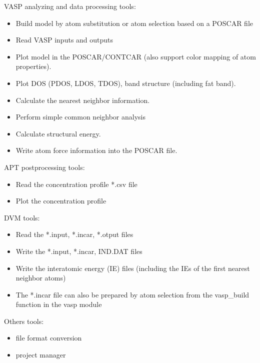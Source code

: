 \documentclass[12pt]{book}
\begin{document}
VASP analyzing and data processing tools:
\begin{itemize}
\item Build model by atom substitution or atom selection based on a POSCAR file
\item Read VASP inputs and outputs
\item Plot model in the POSCAR/CONTCAR (also support color mapping of atom properties).
\item Plot DOS (PDOS, LDOS, TDOS), band structure (including fat band).
\item Calculate the nearest neighbor information.
\item Perform simple common neighbor analysis
\item Calculate structural energy.
\item Write atom force information into the POSCAR file.
\end{itemize}

APT postprocessing tools:
\begin{itemize}
\item Read the concentration profile *.csv file
\item Plot the concentration profile
\end{itemize}

DVM tools:
\begin{itemize}
\item Read the *.input, *.incar, *.otput files
\item Write the *.input, *.incar, IND.DAT files
\item Write the interatomic energy (IE) files (including the IEs of the first nearest neighbor atoms)
\item The *.incar file can also be prepared by atom selection from the vasp\_build function in the vasp module 
\end{itemize}

Others tools:
\begin{itemize}
\item file format conversion
\item project manager
\end{itemize}
\end{document}

